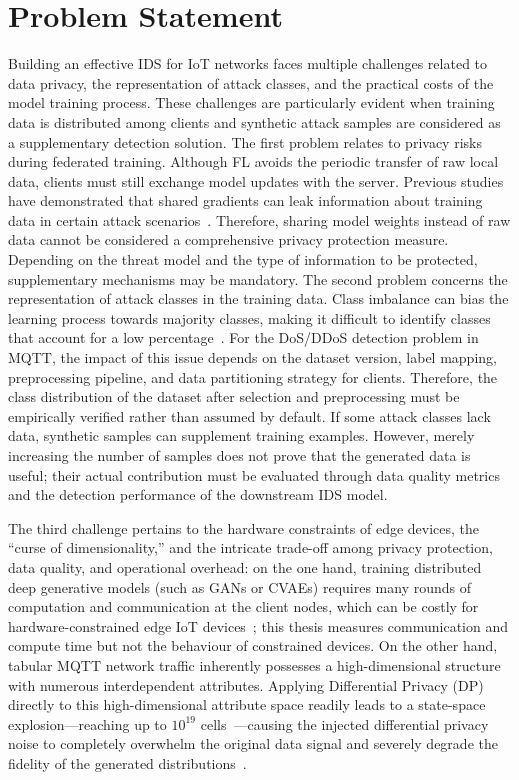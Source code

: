 \section{Problem Statement}
Building an effective IDS for IoT networks faces multiple challenges related to data privacy, the representation of attack classes, and the practical costs of the model training process. These challenges are particularly evident when training data is distributed among clients and synthetic attack samples are considered as a supplementary detection solution. The first problem relates to privacy risks during federated training. Although FL avoids the periodic transfer of raw local data, clients must still exchange model updates with the server. Previous studies have demonstrated that shared gradients can leak information about training data in certain attack scenarios~\cite{zhu2019}. Therefore, sharing model weights instead of raw data cannot be considered a comprehensive privacy protection measure. Depending on the threat model and the type of information to be protected, supplementary mechanisms may be mandatory. The second problem concerns the representation of attack classes in the training data. Class imbalance can bias the learning process towards majority classes, making it difficult to identify classes that account for a low percentage~\cite{he2009}. For the DoS/DDoS detection problem in MQTT, the impact of this issue depends on the dataset version, label mapping, preprocessing pipeline, and data partitioning strategy for clients. Therefore, the class distribution of the dataset after selection and preprocessing must be empirically verified rather than assumed by default. If some attack classes lack data, synthetic samples can supplement training examples. However, merely increasing the number of samples does not prove that the generated data is useful; their actual contribution must be evaluated through data quality metrics and the detection performance of the downstream IDS model.

The third challenge pertains to the hardware constraints of edge devices, the ``curse of dimensionality,'' and the intricate trade-off among privacy protection, data quality, and operational overhead: on the one hand, training distributed deep generative models (such as GANs or CVAEs) requires many rounds of computation and communication at the client nodes, which can be costly for hardware-constrained edge IoT devices~\cite{behera2022fedsyn}; this thesis measures communication and compute time but not the behaviour of constrained devices. On the other hand, tabular MQTT network traffic inherently possesses a high-dimensional structure with numerous interdependent attributes. Applying Differential Privacy (DP) directly to this high-dimensional attribute space readily leads to a state-space explosion---reaching up to $10^{19}$ cells~\cite{mckenna2019pgm}---causing the injected differential privacy noise to completely overwhelm the original data signal and severely degrade the fidelity of the generated distributions~\cite{zhang2017privbayes}.

